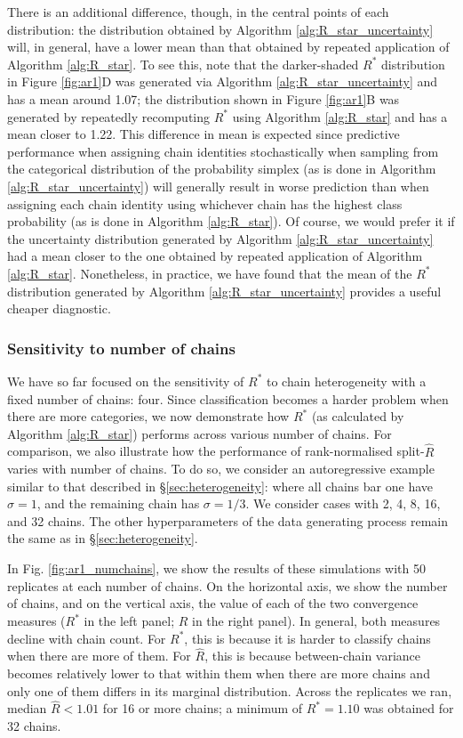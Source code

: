 \documentclass{article}
\begin{document}
There is an additional difference, though, in the central points of each distribution: the distribution obtained by Algorithm \ref{alg:R_star_uncertainty} will, in general, have a lower mean than that obtained by repeated application of Algorithm \ref{alg:R_star}. To see this, note that the darker-shaded $R^*$ distribution in Figure \ref{fig:ar1}D was generated via Algorithm \ref{alg:R_star_uncertainty} and has a mean around 1.07; the distribution shown in Figure \ref{fig:ar1}B was generated by repeatedly recomputing $R^*$ using Algorithm \ref{alg:R_star} and has a mean closer to 1.22. This difference in mean is expected since predictive performance when assigning chain identities stochastically when sampling from the categorical distribution of the probability simplex (as is done in Algorithm \ref{alg:R_star_uncertainty}) will generally result in worse prediction than when assigning each chain identity using whichever chain has the highest class probability (as is done in Algorithm \ref{alg:R_star}). Of course, we would prefer it if the uncertainty distribution generated by Algorithm \ref{alg:R_star_uncertainty} had a mean closer to the one obtained by repeated application of Algorithm \ref{alg:R_star}. Nonetheless, in practice, we have found that the mean of the $R^*$ distribution generated by Algorithm \ref{alg:R_star_uncertainty} provides a useful cheaper diagnostic.

\subsubsection{Sensitivity to number of chains}\label{sec:heterogeneity_numchains}
We have so far focused on the sensitivity of $R^*$ to chain heterogeneity with a fixed number of chains: four. Since classification becomes a harder problem when there are more categories, we now demonstrate how $R^*$ (as calculated by Algorithm \ref{alg:R_star}) performs across various number of chains. For comparison, we also illustrate how the performance of rank-normalised split-$\widehat{R}$ varies with number of chains. To do so, we consider an autoregressive example similar to that described in \S\ref{sec:heterogeneity}: where all chains bar one have $\sigma=1$, and the remaining chain has $\sigma=1/3$. We consider cases with 2, 4, 8, 16, and 32 chains. The other hyperparameters of the data generating process remain the same as in \S\ref{sec:heterogeneity}.

In Fig. \ref{fig:ar1_numchains}, we show the results of these simulations with 50 replicates at each number of chains. On the horizontal axis, we show the number of chains, and on the vertical axis, the value of each of the two convergence measures ($R^*$ in the left panel; $\widehat{R}$ in the right panel). In general, both measures decline with chain count. For $R^*$, this is because it is harder to classify chains when there are more of them. For $\widehat{R}$, this is because between-chain variance becomes relatively lower to that within them when there are more chains and only one of them differs in its marginal distribution. Across the replicates we ran, median $\widehat{R}<1.01$ for 16 or more chains; a minimum of $R^*=1.10$ was obtained for 32 chains.
\end{document}

